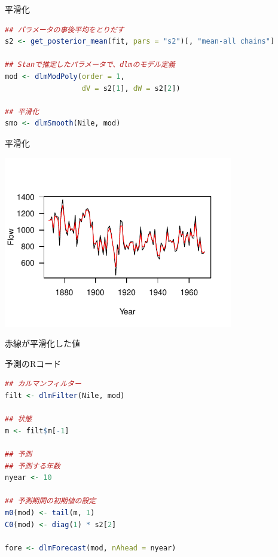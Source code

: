 \documentclass[dvipdfmx,12pt]{beamer}
\begin{document}
\begin{frame}[fragile]{平滑化}
  \begin{lstlisting}[language=R]
## パラメータの事後平均をとりだす
s2 <- get_posterior_mean(fit, pars = "s2")[, "mean-all chains"]

## Stanで推定したパラメータで、dlmのモデル定義
mod <- dlmModPoly(order = 1,
                  dV = s2[1], dW = s2[2])

## 平滑化
smo <- dlmSmooth(Nile, mod)
  \end{lstlisting}
\end{frame}

\begin{frame}{平滑化}
  \begin{center}
    \includegraphics[width=10cm]{dlm1_smooth}
  \end{center}

  赤線が平滑化した値
\end{frame}

\begin{frame}[fragile]{予測のRコード}
  \begin{lstlisting}[language=R]
## カルマンフィルター
filt <- dlmFilter(Nile, mod)

## 状態
m <- filt$m[-1]

## 予測
## 予測する年数
nyear <- 10

## 予測期間の初期値の設定
m0(mod) <- tail(m, 1)
C0(mod) <- diag(1) * s2[2]

fore <- dlmForecast(mod, nAhead = nyear)
  \end{lstlisting}
\end{frame}
\end{document}
